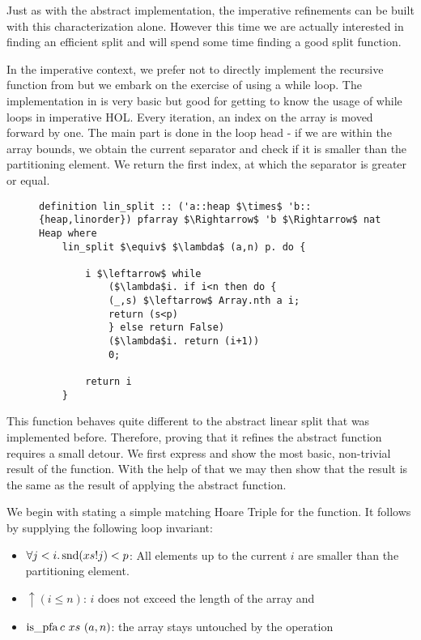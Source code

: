 Just as with the abstract implementation,
the imperative refinements can be built with this characterization alone.
However this time we are actually interested in finding an
efficient split and will spend some time finding
a good split function.

In the imperative context, we prefer not to directly
implement the recursive function from 
but we embark on the exercise of using a while loop.
The implementation in 
is very basic but good for getting to know
the usage of while loops in imperative HOL.
Every iteration, an index on the array is moved forward by one.
The main part is done in the loop head - if we
are within the array bounds,
we obtain the current separator and check if it is
smaller than the partitioning element.
We return the first index, at which the separator is greater or equal.

\begin{figure}
\begin{lstlisting}[mathescape=true, language=Isabelle, caption={The imperative linear split},
    label={lst:imp-linear-split}]
definition lin_split :: ('a::heap $\times$ 'b::{heap,linorder}) pfarray $\Rightarrow$ 'b $\Rightarrow$ nat Heap where
    lin_split $\equiv$ $\lambda$ (a,n) p. do { 
   
        i $\leftarrow$ while  
            ($\lambda$i. if i<n then do { 
            (_,s) $\leftarrow$ Array.nth a i; 
            return (s<p) 
            } else return False)  
            ($\lambda$i. return (i+1))  
            0; 
                
        return i 
    }
\end{lstlisting}
\end{figure}

This function behaves quite different to the abstract linear split
that was implemented before.
Therefore, proving that it refines the abstract function requires a small detour.
We first express and show the most basic, non-trivial result of the function.
With the help of that we may then show that the result is the same as the result
of applying the abstract function.

We begin with stating a simple matching Hoare Triple
for the function.
It follows by supplying the following loop invariant:

\begin{itemize}
    \item $\forall j<i. \operatorname{snd} (xs!j) < p$: All elements up to the current $i$
        are smaller than the partitioning element.
    \item $\uparrow(i \leq n)$: $i$ does not exceed the length of the array and
    \item $\operatorname{is\_pfa} c\ xs\ (a,n)$: the array stays untouched by the operation
\end{itemize}

